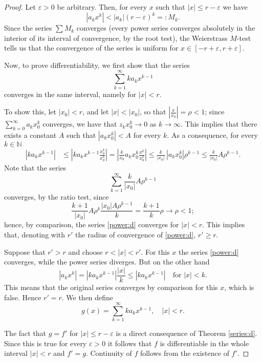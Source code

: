 \documentclass[a4paper,reqno]{amsart}
\numberwithin{equation}{section}
\def\N{\mathbb{N}}
\begin{document}
\begin{proof}
Let $\varepsilon>0$ be arbitrary. Then, for every $x$ such that $|x|\leq r-\varepsilon$ we have
$$
|a_k x^k|<|a_k|(r-\varepsilon)^k=: M_k.
$$
Since the series $\sum M_k$ converges (every power series converges absolutely in the interior of its interval of convergence, by the root test), the Weierstrass $M$-test tells us that the convergence of the series is uniform for $x\in [-r+\varepsilon,r+\varepsilon]$. 

Now, to prove differentiability, we first show that the series 
\begin{equation}\label{power:d}
\sum_{k=1}^\infty k a_k x^{k-1}
\end{equation}
converges in the same interval, namely for $|x|<r$.

To show this, let $|x_0|<r$, and let $|x|<|x_0|$, so that $\left|\frac{x}{x_0}\right|=\rho<1$; since $\sum_{k=0}^\infty a_k x_0^k$ converges, we have that 
$z_k x_0^k\to 0$ as $k\to \infty$. This implies that there exists a constant $A$ such that $|a_kx_0^k|<A$ for every $k$. As a consequence, for every $k\in \N$
\begin{align*}
\left|k a_k x^{k-1}\right| & \leq \left| k a_k x^{k-1} \frac{x_0^k}{x_0^k}\right| = \left|\frac{k}{x_0} a_k x_0^k \frac{x^k}{x_0^k}\right|\leq \frac{k}{|x_0|}\, |a_kx_0^k| \rho^{k-1} \leq \frac{k}{|x_0|} A \rho^{k-1}.
\end{align*}%
Note that the series 
$$
\sum_{k=1}^\infty \frac{k}{|x_0|} A \rho^{k-1}
$$
converges, by the ratio test, since 
$$
\frac{k+1}{|x_0|} A \rho^{k} \frac{|x_0| A \rho^{k-1}}{k} = \frac{k+1}{k} \rho \to \rho <1;
$$
hence, by comparison, the series \eqref{power:d} converges for $|x|<r$. This implies that, denoting with $r'$ the radius of convergence of \eqref{power:d}, $r'\geq r$.

Suppose that $r'>r$ and choose $r<|x|<r'$. For this $x$ the series \eqref{power:d} converges, while the power series diverges. But on the other hand 
$$
|a_k x^k| = |k a_k x^{k-1}| \frac{|x|}k \leq |k a_k x^{k-1}| \quad \textrm{for } |x|<k.
$$
This means that the original series converges by comparison for this $x$, which is false. Hence $r'=r$. 
\medskip
We then define 
$$
g(x) = \sum_{k=1}^\infty k a_k x^{k-1}, \quad |x|<r.
$$

The fact that $g = f'$ for $|x|\leq r-\varepsilon$ is a direct consequence of Theorem \ref{series:d}. Since this is true for every $\varepsilon>0$ it follows that $f$ is differentiable in the whole interval $|x|<r$ and $f'=g$. 
Continuity of $f$ follows from the existence of $f'$. 
\end{proof}
\end{document}

